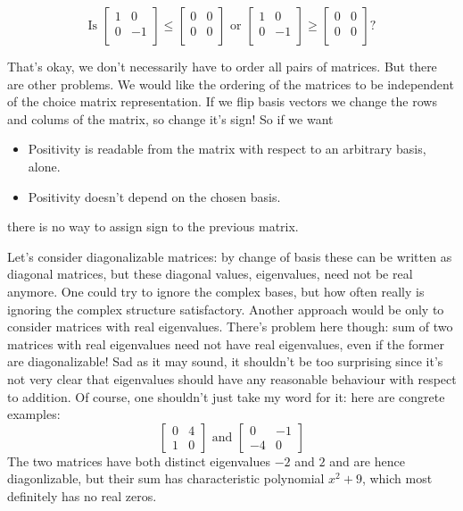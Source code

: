 \[
	\text{Is }
	\begin{bmatrix}
		1 & 0 \\
		0 & -1 \\
	\end{bmatrix}
	\leq
	\begin{bmatrix}
		0 & 0 \\
		0 & 0 \\
	\end{bmatrix}
	\text{ or }
	\begin{bmatrix}
		1 & 0 \\
		0 & -1 \\
	\end{bmatrix}
	\geq
	\begin{bmatrix}
		0 & 0 \\
		0 & 0 \\
	\end{bmatrix}
	\text{?}
\]

That's okay, we don't necessarily have to order all pairs of matrices. But there are other problems. We would like the ordering of the matrices to be independent of the choice matrix representation. If we flip basis vectors we change the rows and colums of the matrix, so change it's sign! So if we want
\begin{itemize}
	\item Positivity is readable from the matrix with respect to an arbitrary basis, alone.
	\item Positivity doesn't depend on the chosen basis.
\end{itemize}
there is no way to assign sign to the previous matrix.

Let's consider diagonalizable matrices: by change of basis these can be written as diagonal matrices, but these diagonal values, eigenvalues, need not be real anymore. One could try to ignore the complex bases, but how often really is ignoring the complex structure satisfactory. Another approach would be only to consider matrices with real eigenvalues. There's problem here though: sum of two matrices with real eigenvalues need not have real eigenvalues, even if the former are diagonalizable! Sad as it may sound, it shouldn't be too surprising since it's not very clear that eigenvalues should have any reasonable behaviour with respect to addition. Of course, one shouldn't just take my word for it: here are congrete examples:
\[
	\begin{bmatrix}
		0 & 4 \\
		1 & 0
	\end{bmatrix}
	\text{ and }
	\begin{bmatrix}
		0 & -1 \\
		-4 & 0
	\end{bmatrix}
\]
The two matrices have both distinct eigenvalues $- 2$ and $2$ and are hence diagonlizable, but their sum has characteristic polynomial $x^2 + 9$, which most definitely has no real zeros.

